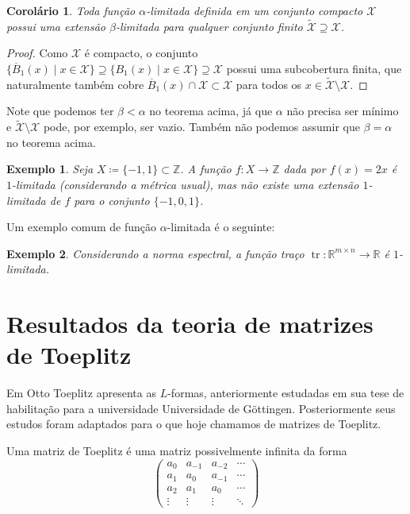 \documentclass[a4paper,12pt]{article}
\DeclareMathOperator{\tr}{tr}
\newtheorem{corollary}{Corolário}
\newtheorem{example}{Exemplo}
\theoremstyle{definition}
\begin{document}
\begin{corollary} Toda função $\alpha$-limitada definida em um conjunto compacto $\mathcal{X}$ possui uma extensão $\beta$-limitada para qualquer conjunto finito $\tilde{\mathcal{X}} \supseteq \mathcal{X}$. \end{corollary}

\begin{proof} Como $\mathcal{X}$ é compacto, o conjunto $\{ \overline{B}_1(x) \mid x \in \mathcal{X} \} \supseteq \{ B_1(x) \mid x \in \mathcal{X} \} \supseteq \mathcal{X}$ possui uma subcobertura finita, que naturalmente também cobre $\overline{B}_1(x) \cap \mathcal{X} \subset \mathcal{X}$ para todos os $x \in \tilde{\mathcal{X}} \setminus \mathcal{X}$. \end{proof}

Note que podemos ter $\beta < \alpha$ no teorema acima, já que $\alpha$ não precisa ser mínimo e $\tilde{\mathcal{X}} \setminus \mathcal{X}$ pode, por exemplo, ser vazio. Também não podemos assumir que $\beta = \alpha$ no teorema acima.

\begin{example} Seja $X \coloneqq \{-1, 1\} \subset \mathbb{Z}$. A função $f : X \to \mathbb{Z}$ dada por $f(x) = 2x$ é $1$-limitada (considerando a métrica usual), mas não existe uma extensão $1$-limitada de $f$ para o conjunto $\{-1, 0, 1\}$. \end{example}

Um exemplo comum de função $\alpha$-limitada é o seguinte:

\begin{example} Considerando a norma espectral, a função traço $\tr : \mathbb{R}^{m \times n} \to \mathbb{R}$ é $1$-limitada. \end{example}

\newpage

\section{Resultados da teoria de matrizes de Toeplitz} \vspace{1cm}

Em \cite{Toeplitz1911} Otto Toeplitz apresenta as $L$-formas, anteriormente estudadas em sua tese de habilitação para a universidade Universidade de Göttingen. Posteriormente seus estudos foram adaptados para o que hoje chamamos de matrizes de Toeplitz.

Uma matriz de Toeplitz é uma matriz possivelmente infinita da forma \[ \begin{pmatrix} a_{0} & a_{-1} & a_{-2} & \cdots \\ a_{1} & a_{0} & a_{-1} & \cdots \\ a_2 & a_{1} & a_{0} & \cdots \\ \vdots & \vdots & \vdots & \ddots \end{pmatrix} \]
\end{document}
